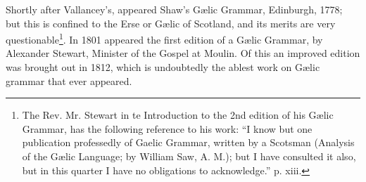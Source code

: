 \documentclass[11pt,oneside]{memoir}
\begin{document}
Shortly after Vallancey's, appeared Shaw's Gælic Grammar, Edinburgh, 1778; but this is confined to the Erse or Gælic of Scotland, and its merits are very questionable\footnote{
    The Rev. Mr. Stewart in te Introduction to the 2nd edition of his Gælic Grammar, has the following reference to his work:
    ``I know but one publication professedly of Gaelic Grammar, %
    written by a Scotsman (Analysis of the Gælic Language; by William Saw, A. M.);
    but I have consulted it also, but in this quarter I have no obligations to acknowledge.'' p. xiii.
}.
In 1801 appeared the first edition of a Gælic Grammar, by Alexander Stewart, Minister of the Gospel at Moulin.
Of this an improved edition was brought out in 1812, which is undoubtedly the ablest work on Gælic grammar that ever appeared. 
\end{document}
